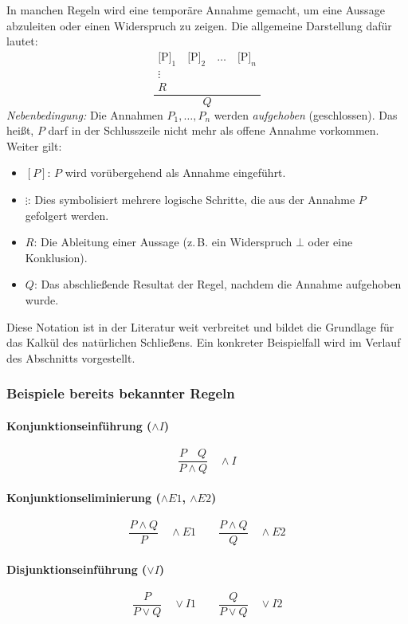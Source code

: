\documentclass[main.tex]{subfiles}
\begin{document}
In manchen Regeln wird eine temporäre Annahme gemacht, um eine Aussage abzuleiten oder einen Widerspruch zu zeigen. Die allgemeine Darstellung dafür lautet:
\[
\frac{
\begin{array}{c}
\text{[P]}_1\quad\text{[P]}_2\quad\hdots \quad\text{[P]}_n \\
\vdots \\
R
\end{array}
}{Q}
\]
\emph{Nebenbedingung:} Die Annahmen $P_1,\hdots, P_n$ werden \emph{aufgehoben} (geschlossen). Das heißt, $P$ darf in der Schlusszeile nicht mehr als offene Annahme vorkommen.
Weiter gilt:
\begin{itemize}
    \item \textbf{$[P]$}: $P$ wird vorübergehend als Annahme eingeführt.
    \item \textbf{$\vdots$}: Dies symbolisiert mehrere logische Schritte, die aus der Annahme $P$ gefolgert werden.
    \item \textbf{$R$}: Die Ableitung einer Aussage (z.\,B. ein Widerspruch $\bot$ oder eine Konklusion).
    \item \textbf{$Q$}: Das abschließende Resultat der Regel, nachdem die Annahme aufgehoben wurde.
\end{itemize}
Diese Notation ist in der Literatur weit verbreitet und bildet die Grundlage für das Kalkül des natürlichen Schließens. Ein konkreter Beispielfall wird im Verlauf des Abschnitts vorgestellt.

\subsubsection{Beispiele bereits bekannter Regeln}

\paragraph{Konjunktionseinführung ($\land I$)} 
\[
\frac{P \quad Q}{P \land Q}
\quad \land I
\]

\paragraph{Konjunktionseliminierung ($\land E1$, $\land E2$)} 
\[
\frac{P \land Q}{P}
\quad \land E1
\quad\quad
\frac{P \land Q}{Q}
\quad \land E2
\]

\paragraph{Disjunktionseinführung ($\lor I$)}
\[
\frac{P}{P \lor Q}
\quad \lor I1
\quad\quad
\frac{Q}{P \lor Q}
\quad \lor I2
\]
\end{document}
